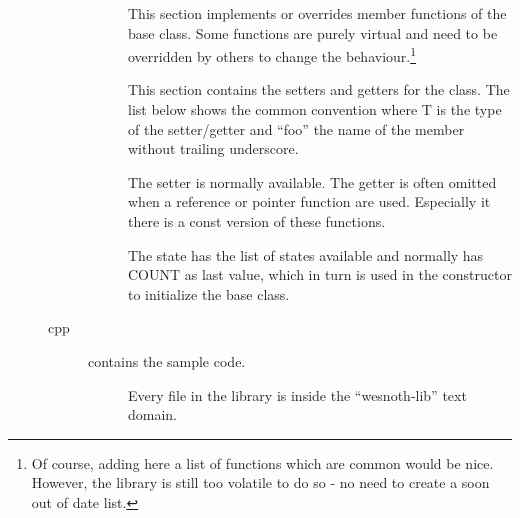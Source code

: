 \begin{description}
\begin{description}
\begin{description}
	\item[]
		This section implements or overrides member functions of the base class.
		Some functions are purely virtual and need to be overridden by others to
		change the behaviour.\footnote{Of course, adding here a list of functions which are
		common would be nice. However, the library is still too
		volatile to do so - no need to create a soon out of date list.}

	\item[]
		This section contains the setters and getters for the class. The
		list below shows the common convention where T is the type of the
		setter/getter and ``foo'' the name of the member without trailing
		underscore.


		The setter is normally available. The getter is often omitted when a
		reference or pointer function are used. Especially it there is a const
		version of these functions.

	\item[]
		The state has the list of states available and normally has COUNT as
		last value, which in turn is used in the constructor to initialize the
		base class.

	\end{description}

\item[cpp]  contains the sample code.
	\begin{description}
	\item[] Every file in the library
		is inside the ``wesnoth-lib'' text domain.


\end{description}
\end{description}
\end{description}
